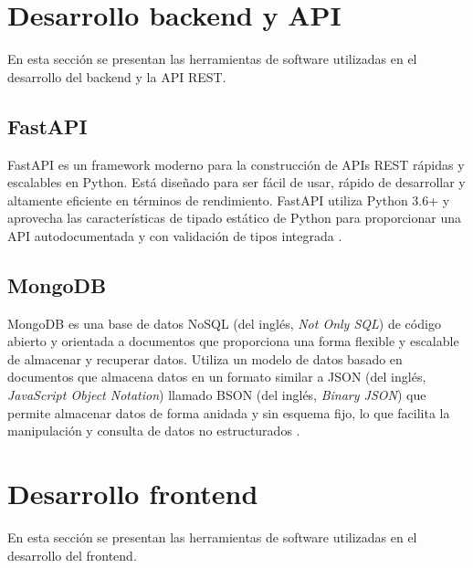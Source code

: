 
\section{Desarrollo backend y API}

En esta sección se presentan las herramientas de software utilizadas en el
desarrollo del backend y la API REST.

\subsection{FastAPI}

FastAPI es un framework moderno para la construcción de APIs REST rápidas y
escalables en Python. Está diseñado para ser fácil de usar, rápido de
desarrollar y altamente eficiente en términos de rendimiento. FastAPI utiliza
Python 3.6+ y aprovecha las características de tipado estático de Python para
proporcionar una API autodocumentada y con validación de tipos integrada
\cite{FastAPI}.

\subsection{MongoDB}

MongoDB es una base de datos NoSQL (del inglés, \textit{Not Only SQL}) de
código abierto y orientada a documentos que proporciona una forma flexible y
escalable de almacenar y recuperar datos. Utiliza un modelo de datos basado en
documentos que almacena datos en un formato similar a JSON (del inglés,
\textit{JavaScript Object Notation}) llamado BSON (del inglés, \textit{Binary
	JSON}) que permite almacenar datos de forma anidada y sin esquema fijo, lo que
facilita la manipulación y consulta de datos no estructurados \cite{MongoDB}.


\section{Desarrollo frontend}

En esta sección se presentan las herramientas de software utilizadas en el
desarrollo del frontend.

